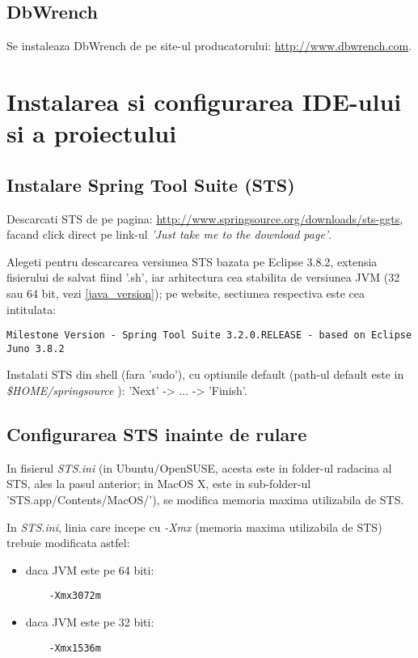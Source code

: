 \subsection{DbWrench}
Se instaleaza DbWrench de pe site-ul producatorului:
\url{http://www.dbwrench.com}.

\section{Instalarea si configurarea IDE-ului si a proiectului}

\subsection{Instalare Spring Tool Suite (STS)}
Descarcati STS de pe pagina:
\url{http://www.springsource.org/downloads/sts-ggts},
facand click direct pe link-ul \emph{'Just take me to the download page'}.

Alegeti pentru descarcarea versiunea STS bazata pe Eclipse 3.8.2, extensia
fisierului de salvat fiind '.sh', iar arhitectura cea stabilita de versiunea
JVM (32 sau 64 bit, vezi \ref{java_version}); pe website, sectiunea respectiva
este cea intitulata:
\begin{lstlisting}[breaklines=true]
Milestone Version - Spring Tool Suite 3.2.0.RELEASE - based on Eclipse Juno 3.8.2
\end{lstlisting}

Instalati STS din shell (fara 'sudo'), cu optiunile default (path-ul default este in \emph{\$HOME/springsource} ):
'Next' -> ... -> 'Finish'.

\subsection{Configurarea STS inainte de rulare}
In fisierul \emph{STS.ini} (in Ubuntu/OpenSUSE, acesta este in folder-ul
radacina al STS, ales la pasul anterior; in MacOS X, este in sub-folder-ul
'STS.app/Contents/MacOS/'), se modifica memoria maxima utilizabila de STS.

In \emph{STS.ini}, linia care incepe cu \emph{-Xmx} 
(memoria maxima utilizabila de STS) 
trebuie modificata astfel:
\begin{itemize} 
\item daca JVM este pe 64 biti:
\begin{lstlisting}
	-Xmx3072m
\end{lstlisting}
\item daca JVM este pe 32 biti:
\begin{lstlisting}
	-Xmx1536m
\end{lstlisting}
\end{itemize}

